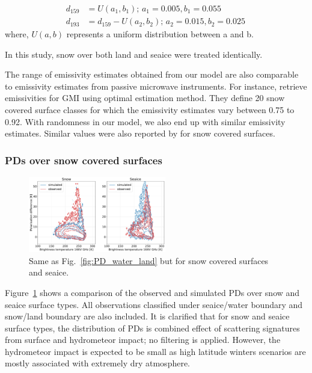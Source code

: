\documentclass[amt, manuscript]{copernicus}
\begin{document}
\begin{align}
d_{159}& = U(a_1, b_1) ;\, a_1 = 0.005, b_1 = 0.055\\
d_{193}& = d_{159} - U(a_2, b_2) ;\, a_2 = 0.015, b_2 = 0.025 \,
\end{align}
where, $U(a, b)$ represents a uniform distribution between a and b. 

In this study, snow over both land and seaice were treated identically.
 
The range of emissivity estimates obtained from our model are also comparable to emissivity estimates from passive microwave instruments. For instance, \citet{munchak2020active} retrieve emissivities for GMI using optimal estimation method. They define 20 snow covered surface classes for which the emissivity estimates vary between 0.75 to 0.92. With randomness in our model, we also end up with similar emissivity estimates. Similar values were also reported by \citet{camplani2021passive} for snow covered surfaces.
 

\subsubsection{PDs over snow covered surfaces}
%
\begin{figure}[t]
	\includegraphics[width=6cm]{Figures/hist2d_snow_surface_jan.pdf}
	\caption{Same as Fig.~\ref{fig:PD_water_land} but for snow covered surfaces and seaice.}
	\label{fig:PD_snow}
\end{figure}

Figure~\ref{fig:PD_snow} shows a comparison of the observed and simulated PDs over snow and seaice surface types. All observations classified under seaice/water boundary and snow/land boundary are also included. It is clarified that for snow and seaice surface types, the distribution of PDs is combined effect of scattering signatures from surface and hydrometeor impact; no filtering is applied. However, the hydrometeor impact is expected to be small as high latitude winters scenarios are mostly associated with extremely dry atmosphere. 
  
\end{document}

